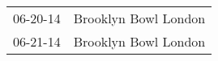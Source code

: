 \begin{supertabular}{p{0.25\columnwidth}p{0.75\columnwidth}}
 06-20-14 &  Brooklyn Bowl London \\
 06-21-14 &  Brooklyn Bowl London \\
\end{supertabular}
